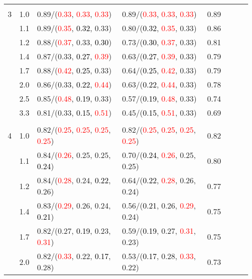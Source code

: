 \documentclass[10pt,a4paper]{report}
\begin{document}
\begin{table}[!htbp]
\begin{center}
{\begin{tabular}{ccllcccc}
			&&&&\\
			3			&1.0&0.89/(\textcolor{red}{0.33}, \textcolor{red}{0.33}, \textcolor{red}{0.33})&0.89/(\textcolor{red}{0.33}, \textcolor{red}{0.33}, \textcolor{red}{0.33})&0.89\\
			&1.1&0.89/(\textcolor{red}{0.35}, \textcolor{black}{0.32}, 0.33)&0.80/(\textcolor{black}{0.32}, \textcolor{red}{0.35}, 0.33)&0.86\\
			&1.2&0.88/(\textcolor{red}{0.37}, 0.33, \textcolor{black}{0.30})&0.73/(\textcolor{black}{0.30}, \textcolor{red}{0.37}, 0.33)&0.81\\
			&1.4&0.87/(0.33, \textcolor{black}{0.27}, \textcolor{red}{0.39})&0.63/(\textcolor{black}{0.27}, \textcolor{red}{0.39}, 0.33)&0.79\\
			&1.7&0.88/(\textcolor{red}{0.42}, \textcolor{black}{0.25}, 0.33)&0.64/(\textcolor{black}{0.25}, \textcolor{red}{0.42}, 0.33)&0.79\\
			&2.0&0.86/(0.33, \textcolor{black}{0.22}, \textcolor{red}{0.44})&0.63/(\textcolor{black}{0.22}, \textcolor{red}{0.44}, 0.33)&0.78\\
			&2.5&0.85/(\textcolor{red}{0.48}, \textcolor{black}{0.19}, 0.33)&0.57/(\textcolor{black}{0.19}, \textcolor{red}{0.48}, 0.33)&0.74\\
			&3.3&0.81/(0.33, \textcolor{black}{0.15}, \textcolor{red}{0.51})&0.45/(\textcolor{black}{0.15}, \textcolor{red}{0.51}, 0.33)&0.69\\
			&&&&\\
			4			&1.0&0.82/(\textcolor{red}{0.25}, \textcolor{red}{0.25}, \textcolor{red}{0.25}, \textcolor{red}{0.25})&0.82/(\textcolor{red}{0.25}, \textcolor{red}{0.25}, \textcolor{red}{0.25}, \textcolor{red}{0.25})&0.82\\
			&1.1&0.84/(\textcolor{red}{0.26}, 0.25, 0.25, \textcolor{black}{0.24})&0.70/(\textcolor{black}{0.24}, \textcolor{red}{0.26}, 0.25, 0.25)&0.80\\
			&1.2&0.84/(\textcolor{red}{0.28}, 0.24, \textcolor{black}{0.22}, 0.26)&0.64/(\textcolor{black}{0.22}, \textcolor{red}{0.28}, 0.26, 0.24)&0.77\\
			&1.4&0.83/(\textcolor{red}{0.29}, 0.26, 0.24, \textcolor{black}{0.21})&0.56/(\textcolor{black}{0.21}, 0.26, \textcolor{red}{0.29}, 0.24)&0.75\\
			&1.7&0.82/(0.27, \textcolor{black}{0.19}, 0.23, \textcolor{red}{0.31})&0.59/(\textcolor{black}{0.19}, 0.27, \textcolor{red}{0.31}, 0.23)&0.75\\
			&2.0&0.82/(\textcolor{red}{0.33}, 0.22, \textcolor{black}{0.17}, 0.28)&0.53/(\textcolor{black}{0.17}, 0.28, \textcolor{red}{0.33}, 0.22)&0.73\\

\end{tabular}}
\end{center}
\end{table}
\end{document}
